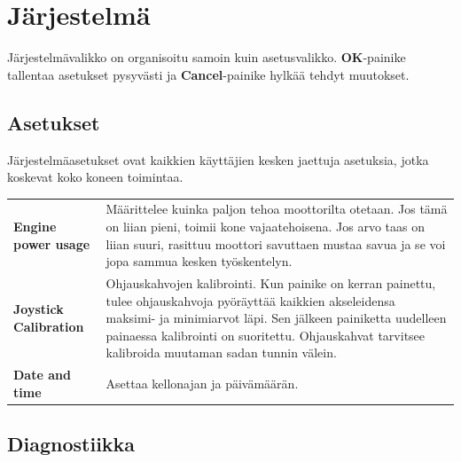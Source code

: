 \documentclass[12pt,a4paper,finnish]{uvmanual}
\begin{document}
\chapter{Järjestelmä}\label{ch:system}

Järjestelmävalikko on organisoitu samoin kuin asetusvalikko. \textbf{OK}-painike tallentaa asetukset pysyvästi ja \textbf{Cancel}-painike hylkää tehdyt muutokset.

\section{Asetukset}\label{ch:system_settings}

Järjestelmäasetukset ovat kaikkien käyttäjien kesken jaettuja asetuksia, jotka koskevat koko koneen toimintaa.



\begin{tabular}{ L{0.2\textwidth} L{0.66\textwidth} }
\textbf{Engine power usage} & Määrittelee kuinka paljon tehoa moottorilta otetaan. Jos tämä on liian pieni, toimii kone vajaatehoisena. Jos arvo taas on liian suuri, rasittuu moottori savuttaen mustaa savua ja se voi jopa sammua kesken työskentelyn. \\
\textbf{Joystick Calibration} & Ohjauskahvojen kalibrointi. Kun painike on kerran painettu, tulee ohjauskahvoja pyöräyttää kaikkien akseleidensa maksimi- ja minimiarvot läpi. Sen jälkeen painiketta uudelleen painaessa kalibrointi on suoritettu. Ohjauskahvat tarvitsee kalibroida muutaman sadan tunnin välein. \\
\textbf{Date and time} & Asettaa kellonajan ja päivämäärän. \\
\end{tabular}





\section{Diagnostiikka}\label{ch:system_diagnostics}
\end{document}
